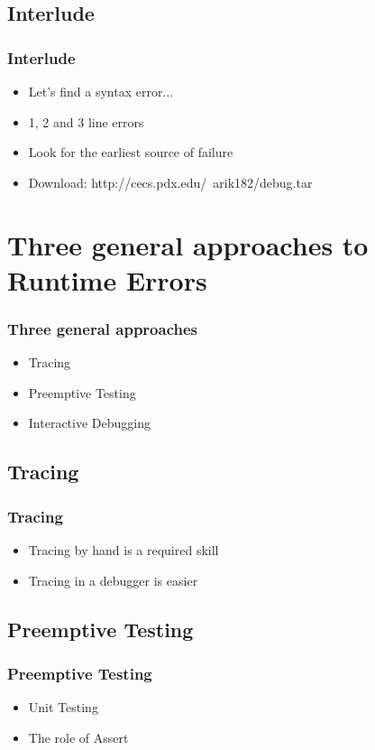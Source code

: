 \documentclass{beamer}
\begin{document}
\subsection{Interlude}
\frame
{
    \frametitle{Interlude}

    \begin{itemize}
        \item Let's find a syntax error...
        \item 1, 2 and 3 line errors
        \item Look for the earliest source of failure
        \item Download: http://cecs.pdx.edu/~arik182/debug.tar
    \end{itemize}
}

\section{Three general approaches to Runtime Errors}
\frame
{
    \frametitle{Three general approaches}

    \begin{itemize}
        \item Tracing
        \item Preemptive Testing
        \item Interactive Debugging
    \end{itemize}
}

\subsection{Tracing}
\frame
{
    \frametitle{Tracing}

    \begin{itemize}
        \item Tracing by hand is a required skill
        \item Tracing in a debugger is easier
    \end{itemize}
}

\subsection{Preemptive Testing}
\frame
{
    \frametitle{Preemptive Testing}

    \begin{itemize}
        \item Unit Testing
        \item The role of Assert
    \end{itemize}
}
\end{document}
